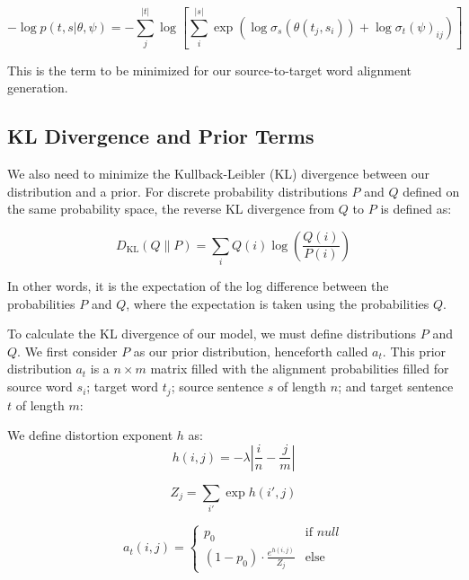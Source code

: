 \documentclass[twoside,twocolumn]{article}
\newlength\mystoreparindent
\newenvironment{myparindent}[1]{%
  \setlength{\mystoreparindent}{\the\parindent}
  \setlength{\parindent}{#1}
  }{%
  \setlength{\parindent}{\mystoreparindent}
}
\begin{document}
\begin{myparindent}{0pt}
\begin{equation}
  -\log  p(t , s | \theta, \psi) =
  - \sum_j^{|t|}  \log \left[ \sum_i^{|s|} \exp
      \left( \log \sigma_s(\theta(t_j, s_i)) + \log \sigma_t(\psi)_{ij} \right)
    \right]
\end{equation}

This is the term to be minimized for our source-to-target word alignment
generation.


\subsection{KL Divergence and Prior Terms}

We also need to minimize the Kullback-Leibler (KL) divergence between our
distribution and a prior. For discrete probability distributions $P$ and $Q$
defined on the same probability space, the reverse KL divergence from $Q$ to
$P$ is defined as:

\begin{equation}
D_{\mathrm{KL}}(Q \| P) = \sum_{i} Q(i) \log \left( \frac{Q(i)}{P(i)} \right)
\end{equation}

In other words, it is the expectation of the log difference between the
probabilities $P$ and $Q$, where the expectation is taken using the
probabilities $Q$.

To calculate the KL divergence of our model, we must define
distributions $P$ and $Q$. We first consider $P$ as our prior
distribution, henceforth called $a_t$. This prior distribution $a_t$ is a
$n \times m$ matrix filled with the alignment probabilities filled for source
word $s_i$; target word $t_j$; source sentence $s$ of length $n$; and target
sentence $t$ of length $m$:

We define distortion exponent $h$ as:
\begin{equation}
  h(i, j) = {-\lambda \left| \frac{i}{n} - \frac{j}{m}\right|}
\end{equation}

\begin{equation}
  Z_j = \sum_{i'} \exp h(i', j)
\end{equation}

\begin{equation}
a_t (i, j) =
\begin{cases}
      p_0 & \text{if } null \\
     (1-p_0) \cdot \frac{e^{h(i,j)}}{Z_j} & \text{else}
   \end{cases}
\end{equation}


\end{myparindent}
\end{document}
